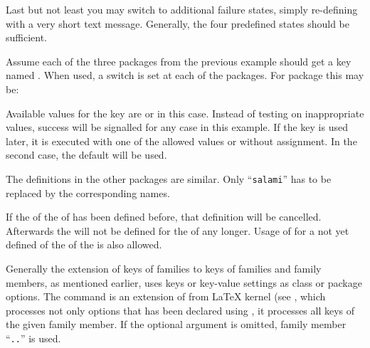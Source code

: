 Last but not least you may switch to additional failure states, simply
re-defining  with a very short text message.
Generally, the four predefined states should be sufficient.

\begin{Example}
  Assume each of the three packages from the previous example should get a
  key named . When used, a switch is set at each of
  the packages. For package  this may be:
  Available values for the key are  or  in this
  case. Instead of testing on inappropriate values, success will be signalled
  for any case in this example. If the key is used later, it is executed with
  one of the allowed values or without assignment. In the second case, the
  default  will be used.

  The definitions in the other packages are similar. Only ``\texttt{salami}''
  has to be replaced by the corresponding names.
\end{Example}
%
%
%
%
%
%
%


\begin{Declaration}
\end{Declaration}
%
If the  of the  of  has been defined before, that definition will be
cancelled. Afterwards the  will not be defined for the  of  any longer. Usage of  for a
not yet defined  of the  of the 
is also allowed.%
%

\begin{Declaration}
\end{Declaration}
%
Generally the extension of keys of families to keys of families and family
members, as mentioned earlier, uses keys or key-value settings as class or
package options. The command  is an extension of
 from \LaTeX{} kernel (see \cite{latex:clsguide}, which
processes not only options that has been declared using ,
it processes all keys of the given family member. If the optional argument
 is omitted, family member
``\texttt{.}\texttt{.}'' is used.

